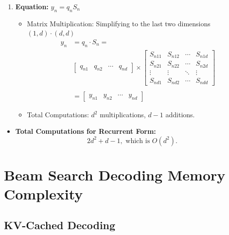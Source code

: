 \documentclass[times, review, 10pt]{elsarticle}
\begin{document}
\begin{enumerate}
    \item[2.] \textbf{Equation:} \(y_n = q_n S_n\)
    \begin{itemize}
        \item Matrix Multiplication: Simplifying to the last two dimensions \((1, d) \cdot (d, d)\)
        \begin{align}
            y_n &= q_n \cdot S_n = \\  %
            &\begin{bmatrix}
                q_{n1} & q_{n2} & \cdots & q_{nd}
            \end{bmatrix}\times
            \begin{bmatrix}
                S_{n11} & S_{n12} & \cdots & S_{n1d} \\
                S_{n21} & S_{n22} & \cdots & S_{n2d} \\
                \vdots & \vdots & \ddots & \vdots \\
                S_{nd1} & S_{nd2} & \cdots & S_{ndd}
            \end{bmatrix} \\ \\
            &= \begin{bmatrix}
                y_{n1} & y_{n2} & \cdots & y_{nd}
            \end{bmatrix}
            \label{eq:app-retrec-ycalc}
        \end{align}
        
        \item Total Computations: \(d^2\) multiplications, \(d-1\) additions.
    \end{itemize}
\end{enumerate}

\begin{itemize}
    \item \textbf{Total Computations for Recurrent Form:}
    \begin{equation}
    \label{eq:app-retrec-total}
    2d^2 + d - 1, \text{ which is } O(d^2).
    \end{equation}
\end{itemize}



\section{Beam Search Decoding Memory Complexity}
\label{supp:beam_m}

\subsection{KV-Cached Decoding}
\end{document}

